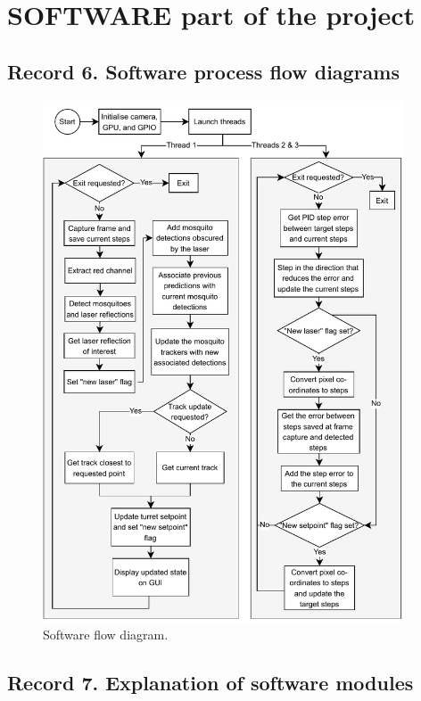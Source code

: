 \section{SOFTWARE part of the project}

\subsection{Record 6. Software process flow diagrams}
\begin{figure}[h]
  \centering
  \includegraphics[width=0.95\textwidth]{figures/software_flow_diagram.pdf}
  \caption{Software flow diagram.}
\end{figure}


\subsection{Record 7. Explanation of software modules}


